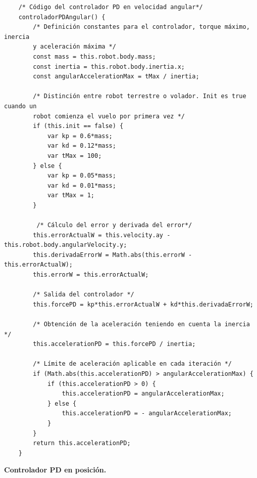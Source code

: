 \footnotesize {
\begin{verbatim}
    /* Código del controlador PD en velocidad angular*/
    controladorPDAngular() {
        /* Definición constantes para el controlador, torque máximo, inercia 
        y aceleración máxima */
        const mass = this.robot.body.mass;
        const inertia = this.robot.body.inertia.x;
        const angularAccelerationMax = tMax / inertia;
        
        /* Distinción entre robot terrestre o volador. Init es true cuando un 
        robot comienza el vuelo por primera vez */   
        if (this.init == false) {
    	    var kp = 0.6*mass;
    	    var kd = 0.12*mass;
    	    var tMax = 100;
        } else {
    	    var kp = 0.05*mass;
    	    var kd = 0.01*mass;
    	    var tMax = 1;
        }
        
         /* Cálculo del error y derivada del error*/
        this.errorActualW = this.velocity.ay - this.robot.body.angularVelocity.y; 
        this.derivadaErrorW = Math.abs(this.errorW - this.errorActualW);
        this.errorW = this.errorActualW;

        /* Salida del controlador */
        this.forcePD = kp*this.errorActualW + kd*this.derivadaErrorW;
        
        /* Obtención de la aceleración teniendo en cuenta la inercia */
        this.accelerationPD = this.forcePD / inertia;

        /* Límite de aceleración aplicable en cada iteración */
        if (Math.abs(this.accelerationPD) > angularAccelerationMax) {
            if (this.accelerationPD > 0) {
                this.accelerationPD = angularAccelerationMax;
            } else {
                this.accelerationPD = - angularAccelerationMax;
            }
        }
        return this.accelerationPD;
    }
\end{verbatim}
}

\normalsize
\textbf{Controlador PD en posición.}

